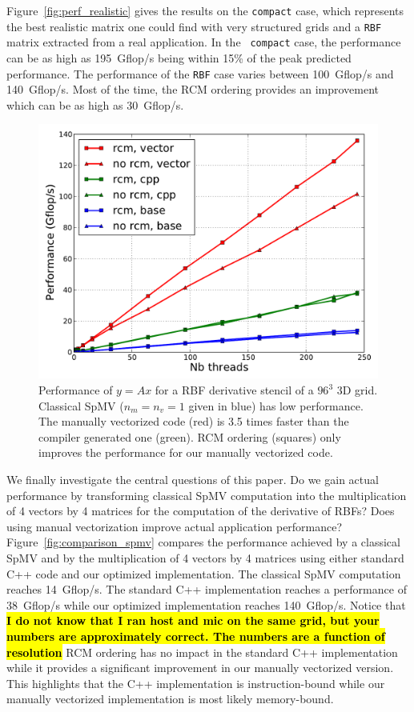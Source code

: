 \documentclass[10pt,conference,compsocconf]{IEEEtran}
\newcommand{\todo}[1]{{\color{red}\textbf{\hl{#1}}\xspace}}
\begin{document}
Figure~\ref{fig:perf_realistic} gives the results on the {\tt compact}
case, which represents the best realistic matrix one could find with very
structured grids and a
{\tt RBF} matrix extracted from a real application. In the {\tt
  compact} case, the performance can be as high as 195~Gflop/s being
within 15\% of the peak predicted performance. The performance of the
{\tt RBF} case varies between 100~Gflop/s and 140~Gflop/s. Most of the
time, the RCM ordering provides an improvement which can be as high as
30~Gflop/s.

\begin{figure}
  \centering 
  
  \includegraphics[width=.9\linewidth]{figures/mic_performance_nb_threads.pdf}

  \caption{Performance of $y=Ax$ for a RBF derivative stencil of a
    $96^3$ 3D grid. Classical SpMV ($n_m=n_v=1$ given in blue) has low
    performance. The manually vectorized code (red) is 3.5 times
    faster than the compiler generated one (green). RCM ordering
    (squares) only improves the performance for our manually
    vectorized code.}
  \label{fig:comparison_spmv}
  \label{fig:perf_mic}
\end{figure}

We finally investigate the central questions of this paper. Do we gain
actual performance by transforming classical SpMV computation into the
multiplication of 4 vectors by 4 matrices for the computation of the
derivative of RBFs? Does using manual vectorization improve actual
application performance? Figure~\ref{fig:comparison_spmv} compares the
performance achieved by a classical SpMV and by the multiplication of
4 vectors by 4 matrices using either standard C++ code and our
optimized implementation. The
classical SpMV computation reaches 14~Gflop/s. 
The standard C++ implementation reaches a performance of 38~Gflop/s while our
optimized implementation reaches 140~Gflop/s. 
Notice that \todo{I do not know that I ran host and mic on the same grid, but your 
numbers are approximately correct. The numbers are a function of resolution} 
RCM ordering has no impact in the standard C++ implementation while it
provides a significant improvement in our manually vectorized
version. This highlights that the C++ implementation is instruction-bound
while our manually vectorized implementation is most likely 
memory-bound. 
\end{document}
